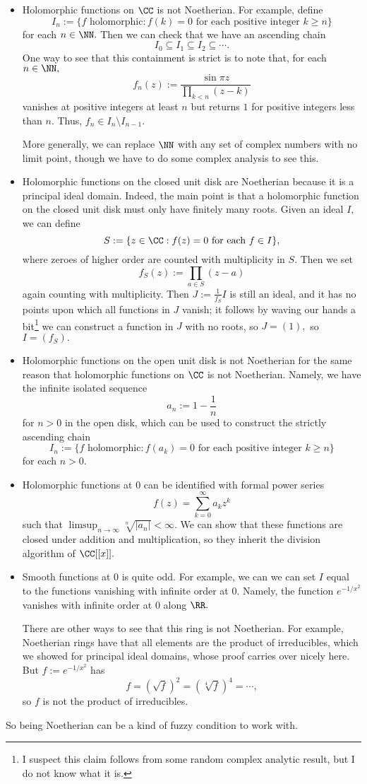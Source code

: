 \begin{itemize}
	\item Holomorphic functions on $\CC$ is not Noetherian. For example, define
	\[I_n:=\{f\text{ holomorphic}:f(k)=0\text{ for each positive integer }k\ge n\}\]
	for each $n\in\NN.$ Then we can check that we have an ascending chain
	\[I_0\subseteq I_1\subseteq I_2\subseteq\cdots.\]
	One way to see that this containment is strict is to note that, for each $n\in\NN,$
	\[f_n(z):=\frac{\sin\pi z}{\prod_{k<n}(z-k)}\]
	vanishes at positive integers at least $n$ but returns $1$ for positive integers less than $n.$ Thus, $f_n\in I_n\setminus I_{n-1}.$
	
	More generally, we can replace $\NN$ with any set of complex numbers with no limit point, though we have to do some complex analysis to see this.
	\item Holomorphic functions on the closed unit disk are Noetherian because it is a principal ideal domain. Indeed, the main point is that a holomorphic function on the closed unit disk must only have finitely many roots. Given an ideal $I,$ we can define
	\[S:=\{z\in\CC:f(z)=0\text{ for each }f\in I\},\]
	where zeroes of higher order are counted with multiplicity in $S.$ Then we set
	\[f_S(z):=\prod_{a\in S}(z-a)\]
	again counting with multiplicity. Then $J:=\frac1{f_S}I$ is still an ideal, and it has no points upon which all functions in $J$ vanish; it follows by waving our hands a bit\footnote{I suspect this claim follows from some random complex analytic result, but I do not know what it is.} we can construct a function in $J$ with no roots, so $J=(1),$ so $I=(f_S).$
	\item Holomorphic functions on the open unit disk is not Noetherian for the same reason that holomorphic functions on $\CC$ is not Noetherian. Namely, we have the infinite isolated sequence
	\[a_n:=1-\frac1n\]
	for $n>0$ in the open disk, which can be used to construct the strictly ascending chain
	\[I_n:=\{f\text{ holomorphic}:f(a_k)=0\text{ for each positive integer }k\ge n\}\]
	for each $n>0.$
	\item Holomorphic functions at $0$ can be identified with formal power series
	\[f(z)=\sum_{k=0}^\infty a_kz^k\]
	such that $\limsup_{n\to\infty}\sqrt[n]{|a_n|}<\infty.$ We can show that these functions are closed under addition and multiplication, so they inherit the division algorithm of $\CC[[x]].$
	\item Smooth functions at $0$ is quite odd. For example, we can we can set $I$ equal to the functions vanishing with infinite order at $0.$ Namely, the function $e^{-1/x^2}$ vanishes with infinite order at $0$ along $\RR.$

	There are other ways to see that this ring is not Noetherian. For example, Noetherian rings have that all elements are the product of irreducibles, which we showed for principal ideal domains, whose proof carries over nicely here. But $f:=e^{-1/x^2}$ has
	\[f=\left(\sqrt f\right)^2=\left(\sqrt[4]f\right)^4=\cdots,\]
	so $f$ is not the product of irreducibles.
\end{itemize}
So being Noetherian can be a kind of fuzzy condition to work with.


